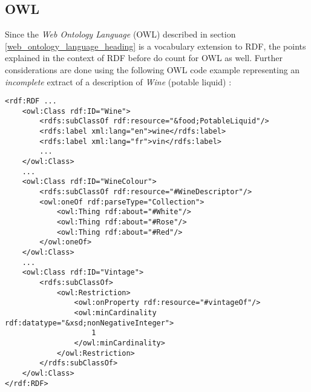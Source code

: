 %
%
%
%
%
%
%

\subsection{OWL}
\label{owl_heading}

Since the \emph{Web Ontology Language} (OWL) described in section
\ref{web_ontology_language_heading} is a vocabulary extension to RDF, the
points explained in the context of RDF before do count for OWL as well. Further
considerations are done using the following OWL code example representing an
\emph{incomplete} extract of a description of \emph{Wine} (potable liquid)
\cite{owlguide}:

\begin{scriptsize}
    \begin{verbatim}
<rdf:RDF ...
    <owl:Class rdf:ID="Wine">
        <rdfs:subClassOf rdf:resource="&food;PotableLiquid"/>
        <rdfs:label xml:lang="en">wine</rdfs:label>
        <rdfs:label xml:lang="fr">vin</rdfs:label>
        ...
    </owl:Class>
    ...
    <owl:Class rdf:ID="WineColour">
        <rdfs:subClassOf rdf:resource="#WineDescriptor"/>
        <owl:oneOf rdf:parseType="Collection">
            <owl:Thing rdf:about="#White"/>
            <owl:Thing rdf:about="#Rose"/>
            <owl:Thing rdf:about="#Red"/>
        </owl:oneOf>
    </owl:Class>
    ...
    <owl:Class rdf:ID="Vintage">
        <rdfs:subClassOf>
            <owl:Restriction>
                <owl:onProperty rdf:resource="#vintageOf"/>
                <owl:minCardinality rdf:datatype="&xsd;nonNegativeInteger">
                    1
                </owl:minCardinality>
            </owl:Restriction>
        </rdfs:subClassOf>
    </owl:Class>
</rdf:RDF>
    \end{verbatim}
\end{scriptsize}

